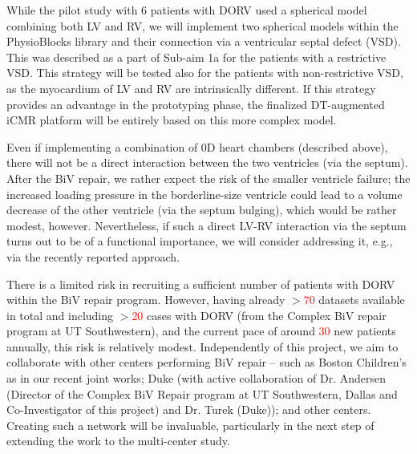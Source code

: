 While the pilot study with 6 patients with DORV used a spherical model combining both LV and RV, we will implement two spherical models within the PhysioBlocks library and their connection via a ventricular septal defect (VSD).  This was described as a part of Sub-aim 1a for the patients with a restrictive VSD. This strategy will be tested also for the patients with non-restrictive VSD, as the myocardium of LV and RV are intrinsically different.  If this strategy provides an advantage in the prototyping phase, the finalized DT-augmented iCMR platform will be entirely based on this more complex model.  

Even if implementing a combination of 0D heart chambers (described above),
there will not be a direct interaction between the two ventricles (via the septum). After the BiV repair, we rather expect the risk of the smaller ventricle failure; the increased loading pressure in the borderline-size ventricle could lead to a volume decrease of the other ventricle (via the septum bulging), which would be rather modest, however. Nevertheless, if such a direct LV-RV interaction via the septum turns out to be of a functional importance, we will consider addressing it, e.g., via the recently reported approach\cite{nguyen_FIMH2025}. 

There is a limited risk in recruiting a sufficient number of patients with DORV within the BiV repair program. However, having already $>$\textcolor{red}{70} datasets available in total and including $>$\textcolor{red}{20} cases with DORV (from the Complex BiV repair program at UT Southwestern), and the current pace of around \textcolor{red}{30} new patients annually, this risk is relatively modest. 
Independently of this project, we aim to collaborate with other centers performing BiV repair -- such as Boston Children’s as in our recent joint works\cite{gusseva23,gusseva25a}; Duke (with active collaboration of  Dr. Andersen (Director of the Complex BiV Repair program at UT Southwestern, Dallas and Co-Investigator of this project) and Dr. Turek (Duke)); and other centers. Creating such a network will be invaluable, particularly in the next step of extending the work to the multi-center study. 




